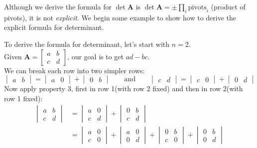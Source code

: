 Although we derive the formula for $\det\bm A$ is $\det\bm A=\pm\prod_i\text{pivots}_{i}$ (product of pivots), it is not \emph{explicit}. We begin some example to show how to derive the explicit formula for determinant.
\begin{example}
To derive the formula for determinant, let's start with $n=2$.\\ Given $\bm A=\begin{bmatrix}
a&b\\c&d
\end{bmatrix}$, our goal is to get $ad-bc$.\\
We can break each row into two simpler rows:
\[
\begin{vmatrix}
a&b
\end{vmatrix}=\begin{vmatrix}
a&0
\end{vmatrix}+\begin{vmatrix}
0&b
\end{vmatrix}\qquad\text{and}\qquad
\begin{vmatrix}
c&d
\end{vmatrix}=\begin{vmatrix}
c&0
\end{vmatrix}+\begin{vmatrix}
0&d
\end{vmatrix}
\]
Now apply property 3, first in row 1(with row 2 fixed) and then in row 2(with row 1 fixed):
\[
\begin{aligned}
\begin{vmatrix}
a&b\\c&d
\end{vmatrix}&=\begin{vmatrix}
a&0\\c&d
\end{vmatrix}+\begin{vmatrix}
0&b\\c&d
\end{vmatrix}\\&=\begin{vmatrix}
a&0\\c&0
\end{vmatrix}+\begin{vmatrix}
a&0\\0&d
\end{vmatrix}+\begin{vmatrix}
0&b\\c&0
\end{vmatrix}+\begin{vmatrix}
0&b\\0&d

\end{vmatrix}
\end{aligned}\]
\end{example}
